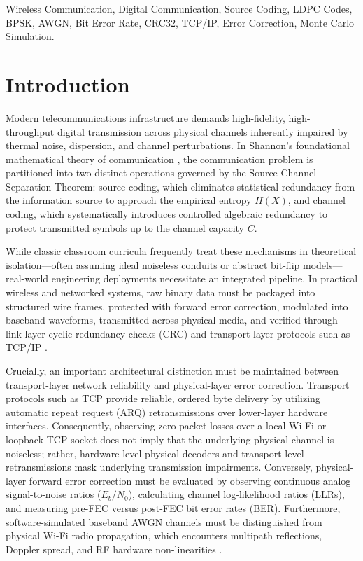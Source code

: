 \documentclass[conference]{IEEEtran}
\begin{document}
\begin{IEEEkeywords}
Wireless Communication, Digital Communication, Source Coding, LDPC Codes, BPSK, AWGN, Bit Error Rate, CRC32, TCP/IP, Error Correction, Monte Carlo Simulation.
\end{IEEEkeywords}

\section{Introduction}
Modern telecommunications infrastructure demands high-fidelity, high-throughput digital transmission across physical channels inherently impaired by thermal noise, dispersion, and channel perturbations. In Shannon's foundational mathematical theory of communication \cite{shannon1948}, the communication problem is partitioned into two distinct operations governed by the Source-Channel Separation Theorem: source coding, which eliminates statistical redundancy from the information source to approach the empirical entropy $H(X)$, and channel coding, which systematically introduces controlled algebraic redundancy to protect transmitted symbols up to the channel capacity $C$.

While classic classroom curricula frequently treat these mechanisms in theoretical isolation—often assuming ideal noiseless conduits or abstract bit-flip models—real-world engineering deployments necessitate an integrated pipeline. In practical wireless and networked systems, raw binary data must be packaged into structured wire frames, protected with forward error correction, modulated into baseband waveforms, transmitted across physical media, and verified through link-layer cyclic redundancy checks (CRC) and transport-layer protocols such as TCP/IP \cite{postel1981rfc793}.

Crucially, an important architectural distinction must be maintained between transport-layer network reliability and physical-layer error correction. Transport protocols such as TCP provide reliable, ordered byte delivery by utilizing automatic repeat request (ARQ) retransmissions over lower-layer hardware interfaces. Consequently, observing zero packet losses over a local Wi-Fi or loopback TCP socket does not imply that the underlying physical channel is noiseless; rather, hardware-level physical decoders and transport-level retransmissions mask underlying transmission impairments. Conversely, physical-layer forward error correction must be evaluated by observing continuous analog signal-to-noise ratios ($E_b/N_0$), calculating channel log-likelihood ratios (LLRs), and measuring pre-FEC versus post-FEC bit error rates (BER). Furthermore, software-simulated baseband AWGN channels must be distinguished from physical Wi-Fi radio propagation, which encounters multipath reflections, Doppler spread, and RF hardware non-linearities \cite{tse2005}.
\end{document}
